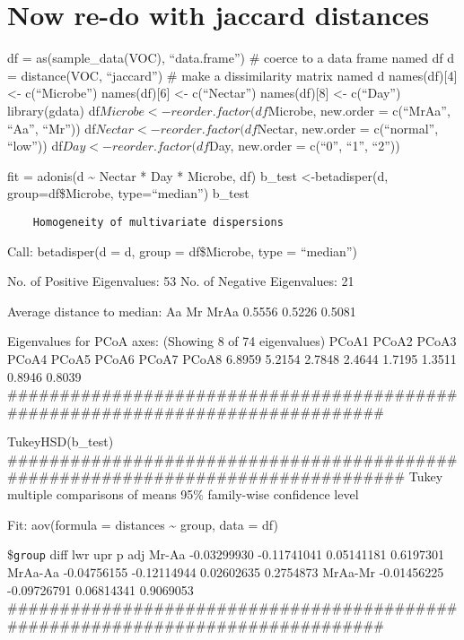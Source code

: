 \documentclass[]{article}
\begin{document}
\subsubsection{}\label{section-5}

\section{Now re-do with jaccard
distances}\label{now-re-do-with-jaccard-distances}

df = as(sample\_data(VOC), ``data.frame'') \# coerce to a data frame
named df d = distance(VOC, ``jaccard'') \# make a dissimilarity matrix
named d names(df){[}4{]} \textless{}- c(``Microbe'') names(df){[}6{]}
\textless{}- c(``Nectar'') names(df){[}8{]} \textless{}- c(``Day'')
library(gdata) df\(Microbe <- reorder.factor(df\)Microbe, new.order =
c(``MrAa'', ``Aa'', ``Mr'')) df\(Nectar <- reorder.factor(df\)Nectar,
new.order = c(``normal'', ``low'')) df\(Day <- reorder.factor(df\)Day,
new.order = c(``0'', ``1'', ``2''))

fit = adonis(d \textasciitilde{} Nectar * Day * Microbe, df) b\_test
\textless{}-betadisper(d, group=df\$Microbe, type=``median'') b\_test

\begin{verbatim}
    Homogeneity of multivariate dispersions
\end{verbatim}

Call: betadisper(d = d, group = df\$Microbe, type = ``median'')

No. of Positive Eigenvalues: 53 No. of Negative Eigenvalues: 21

Average distance to median: Aa Mr MrAa 0.5556 0.5226 0.5081

Eigenvalues for PCoA axes: (Showing 8 of 74 eigenvalues) PCoA1 PCoA2
PCoA3 PCoA4 PCoA5 PCoA6 PCoA7 PCoA8 6.8959 5.2154 2.7848 2.4644 1.7195
1.3511 0.8946 0.8039
\#\#\#\#\#\#\#\#\#\#\#\#\#\#\#\#\#\#\#\#\#\#\#\#\#\#\#\#\#\#\#\#\#\#\#\#\#\#\#\#\#\#\#\#\#\#\#\#\#\#\#\#\#\#\#\#\#\#\#\#\#\#\#\#\#\#\#\#\#\#\#\#\#\#\#\#\#\#\#

TukeyHSD(b\_test)
\#\#\#\#\#\#\#\#\#\#\#\#\#\#\#\#\#\#\#\#\#\#\#\#\#\#\#\#\#\#\#\#\#\#\#\#\#\#\#\#\#\#\#\#\#\#\#\#\#\#\#\#\#\#\#\#\#\#\#\#\#\#\#\#\#\#\#\#\#\#\#\#\#\#\#\#\#\#\#\#\#
Tukey multiple comparisons of means 95\% family-wise confidence level

Fit: aov(formula = distances \textasciitilde{} group, data = df)

\$\texttt{group} diff lwr upr p adj Mr-Aa -0.03299930 -0.11741041
0.05141181 0.6197301 MrAa-Aa -0.04756155 -0.12114944 0.02602635
0.2754873 MrAa-Mr -0.01456225 -0.09726791 0.06814341 0.9069053
\#\#\#\#\#\#\#\#\#\#\#\#\#\#\#\#\#\#\#\#\#\#\#\#\#\#\#\#\#\#\#\#\#\#\#\#\#\#\#\#\#\#\#\#\#\#\#\#\#\#\#\#\#\#\#\#\#\#\#\#\#\#\#\#\#\#\#\#\#\#\#\#\#\#\#\#\#\#\#
\end{document}
